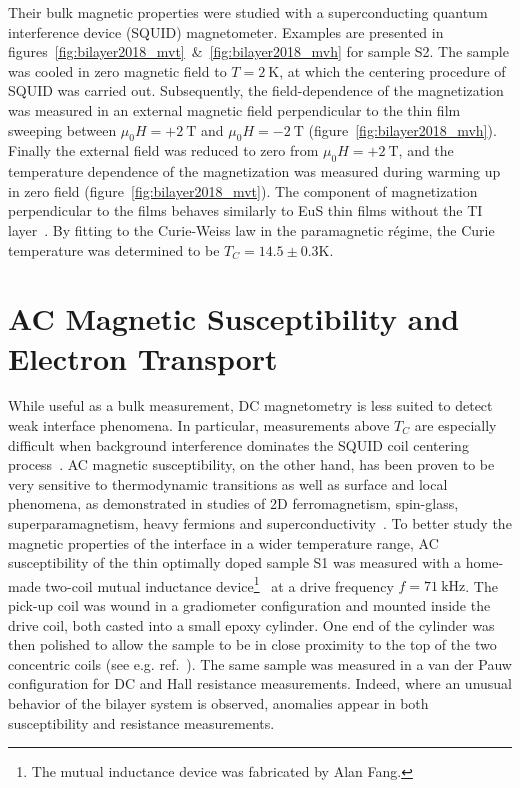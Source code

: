 %
%
%
Their bulk magnetic properties were studied with a superconducting quantum interference device (SQUID) magnetometer. Examples are presented in figures~\ref{fig:bilayer2018_mvt}~\&~\ref{fig:bilayer2018_mvh} for sample S2. The sample was cooled in zero magnetic field to $T=2~\mathrm{K}$, at which the centering procedure of SQUID was carried out. Subsequently, the field-dependence of the magnetization was measured in an external magnetic field perpendicular to the thin film sweeping between $\mu_0H = +2~\mathrm{T}$ and $\mu_0H = -2~\mathrm{T}$ (figure~\ref{fig:bilayer2018_mvh}). Finally the external field was reduced to zero from $\mu_0H = +2~\mathrm{T}$, and the temperature dependence of the magnetization was measured during warming up in zero field (figure~\ref{fig:bilayer2018_mvt}). The component of magnetization perpendicular to the films behaves similarly to EuS thin films without the TI layer~\cite{EuS_PLD}. By fitting to the Curie-Weiss law in the paramagnetic r\'egime, the Curie temperature was determined to be $T_C = 14.5\pm0.3\mathrm{K}$.

\section{AC Magnetic Susceptibility and Electron Transport}
While useful as a bulk measurement, DC magnetometry is less suited to detect weak interface phenomena. In particular, measurements above $T_C$ are especially difficult when background interference dominates the SQUID coil centering process~\cite{squid_center_error}. AC magnetic susceptibility, on the other hand, has been proven to be very sensitive to thermodynamic transitions as well as surface and local phenomena, as demonstrated in studies of 2D ferromagnetism, spin-glass, superparamagnetism, heavy fermions and superconductivity~\cite{ac_nitroxide, ac_spin_glass, ac_superpara, Ando1994, Gegenwart2005, Schemm2014}. To better study the magnetic properties of the interface in a wider temperature range, AC susceptibility of the thin optimally doped sample S1 was measured with a home-made two-coil mutual inductance device\footnote{The mutual inductance device was fabricated by Alan Fang.}~\cite{Jeanneret1989,Yazdani1993} at a drive frequency $f=71~\mathrm{kHz}$. The pick-up coil was wound in a gradiometer configuration and mounted inside the drive coil, both casted into a small epoxy cylinder. One end of the cylinder was then polished to allow the sample to be in close proximity to the top of the two concentric coils (see e.g. ref.~\cite{YazdaniThesis}). The same sample was measured in a van der Pauw configuration for DC and Hall resistance measurements. Indeed, where an unusual behavior of the bilayer system is observed, anomalies appear in both susceptibility and resistance measurements.

